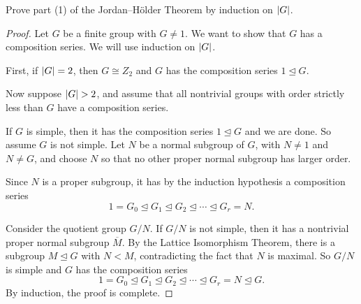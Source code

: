  Prove part (1) of the Jordan--H\"older Theorem by induction
on $\lvert{G}\rvert$.
\begin{proof}
  Let $G$ be a finite group with $G\neq1$. We want to show that $G$
  has a composition series. We will use induction on $\lvert{G}\rvert$.

  First, if $\lvert{G}\rvert = 2$, then $G\cong Z_2$ and $G$ has the
  composition series $1\trianglelefteq G$.

  Now suppose $\lvert{G}\rvert > 2$, and assume that all nontrivial groups
  with order strictly less than $G$ have a composition series.

  If $G$ is simple, then it has the composition series
  $1\trianglelefteq G$ and we are done. So assume $G$ is not
  simple. Let $N$ be a normal subgroup of $G$, with $N\neq1$ and
  $N\neq G$, and choose $N$ so that no other proper normal subgroup
  has larger order.

  Since $N$ is a proper subgroup, it has by the induction hypothesis a
  composition series
  \begin{equation*}
    1 = G_0 \trianglelefteq G_1 \trianglelefteq
    G_2 \trianglelefteq\cdots\trianglelefteq
    G_r = N.
  \end{equation*}

  Consider the quotient group $G/N$. If $G/N$ is not simple, then it
  has a nontrivial proper normal subgroup $\overline{M}$. By the
  Lattice Isomorphism Theorem, there is a subgroup
  $M\trianglelefteq G$ with $N<M$, contradicting the fact that $N$ is
  maximal. So $G/N$ is simple and $G$ has the composition series
  \begin{equation*}
    1 = G_0 \trianglelefteq G_1 \trianglelefteq
    G_2 \trianglelefteq\cdots\trianglelefteq
    G_r = N \trianglelefteq G.
  \end{equation*}
  By induction, the proof is complete.
\end{proof}

